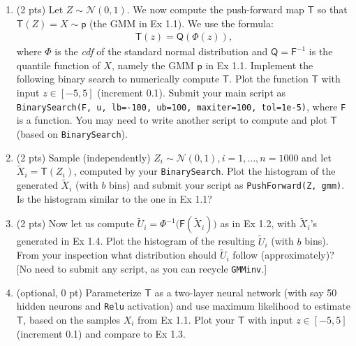 \documentclass[10pt,letter,notitlepage]{article}
\newcommand{\Tsf}{\mathsf{T}}
\newcommand{\Fsf}{\mathsf{F}}
\newcommand{\pp}{\mathsf{p}}
\newcommand{\Qsf}{\mathsf{Q}}
\newcounter{exercise}
\begin{document}
\begin{exercise}
\begin{enumerate}

		\item (2 pts) Let $Z \sim \mathcal{N}(0,1)$. We now compute the push-forward map $\Tsf$ so that $\Tsf(Z) = X \sim \pp$ (the GMM in Ex 1.1). We use the formula:
		\begin{align}
		\Tsf(z) = \Qsf( \Phi(z) ),
		\end{align}
		where $\Phi$ is the \emph{cdf} of the standard normal distribution and $\Qsf = \Fsf^{-1}$ is the quantile function of $X$, namely the GMM $\pp$ in Ex 1.1. Implement the following binary search  to numerically compute $\Tsf$. Plot the function $\Tsf$ with input $z \in [-5,5]$ (increment 0.1). Submit your main script as \verb|BinarySearch(F, u, lb=-100, ub=100, maxiter=100, tol=1e-5)|, where \verb|F| is a function. You may need to write another script to compute and plot $\Tsf$ (based on \verb|BinarySearch|).

		\item (2 pts) Sample (independently) $Z_i \sim \mathcal{N}(0,1), i = 1, \ldots, n=1000$ and let $\tilde X_i = \Tsf(Z_i)$, computed by your \verb|BinarySearch|. Plot the histogram of the generated $\tilde X_i$ (with $b$ bins) and submit your script as \verb|PushForward(Z, gmm)|. Is the histogram similar to the one in Ex 1.1?

		\item (2 pts) Now let us compute $\tilde U_i = \Phi^{-1}\big(\Fsf(\tilde X_i))$ as in Ex 1.2, with $\tilde X_i$'s generated in Ex 1.4. Plot the histogram of the resulting $\tilde U_i$ (with $b$ bins). From your inspection what distribution should $\tilde U_i$ follow (approximately)? [No need to submit any script, as you can recycle \verb|GMMinv|.]

		\item (optional, 0 pt) Parameterize $\Tsf$ as a two-layer neural network (with say 50 hidden neurons and \texttt{Relu} activation) and use maximum likelihood to estimate $\Tsf$, based on the samples $X_i$ from Ex 1.1. Plot your $\Tsf$ with input $z \in [-5,5]$ (increment 0.1) and compare to Ex 1.3.
	\end{enumerate}

\end{exercise}
\end{document}
